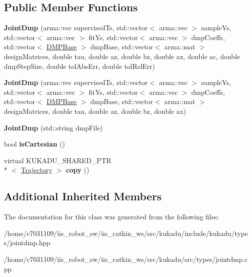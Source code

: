 \subsection*{Public Member Functions}
\begin{DoxyCompactItemize}
\item 
\hypertarget{classkukadu_1_1JointDmp_a2f2b43e39e2d7ece9ad0a958ccbac8e8}{{\bfseries Joint\-Dmp} (arma\-::vec supervised\-Ts, std\-::vector$<$ arma\-::vec $>$ sample\-Ys, std\-::vector$<$ arma\-::vec $>$ fit\-Ys, std\-::vector$<$ arma\-::vec $>$ dmp\-Coeffs, std\-::vector$<$ \hyperlink{classkukadu_1_1DMPBase}{D\-M\-P\-Base} $>$ dmp\-Base, std\-::vector$<$ arma\-::mat $>$ design\-Matrices, double tau, double az, double bz, double ax, double ac, double dmp\-Step\-Size, double tol\-Abs\-Err, double tol\-Rel\-Err)}\label{classkukadu_1_1JointDmp_a2f2b43e39e2d7ece9ad0a958ccbac8e8}

\item 
\hypertarget{classkukadu_1_1JointDmp_a58dc179759c2a9ebbbfe6d13cf65794c}{{\bfseries Joint\-Dmp} (arma\-::vec supervised\-Ts, std\-::vector$<$ arma\-::vec $>$ sample\-Ys, std\-::vector$<$ arma\-::vec $>$ fit\-Ys, std\-::vector$<$ arma\-::vec $>$ dmp\-Coeffs, std\-::vector$<$ \hyperlink{classkukadu_1_1DMPBase}{D\-M\-P\-Base} $>$ dmp\-Base, std\-::vector$<$ arma\-::mat $>$ design\-Matrices, double tau, double az, double bz, double ax)}\label{classkukadu_1_1JointDmp_a58dc179759c2a9ebbbfe6d13cf65794c}

\item 
\hypertarget{classkukadu_1_1JointDmp_a4984be2815b7a0b1e6f14ecee33593b2}{{\bfseries Joint\-Dmp} (std\-::string dmp\-File)}\label{classkukadu_1_1JointDmp_a4984be2815b7a0b1e6f14ecee33593b2}

\item 
\hypertarget{classkukadu_1_1JointDmp_a12d8909497b9d4f38c1cac86a1ad6601}{bool {\bfseries is\-Cartesian} ()}\label{classkukadu_1_1JointDmp_a12d8909497b9d4f38c1cac86a1ad6601}

\item 
\hypertarget{classkukadu_1_1JointDmp_ac3fd610d7a8e2f74143071d06ae04290}{virtual K\-U\-K\-A\-D\-U\-\_\-\-S\-H\-A\-R\-E\-D\-\_\-\-P\-T\-R\\*
$<$ \hyperlink{classkukadu_1_1Trajectory}{Trajectory} $>$ {\bfseries copy} ()}\label{classkukadu_1_1JointDmp_ac3fd610d7a8e2f74143071d06ae04290}

\end{DoxyCompactItemize}
\subsection*{Additional Inherited Members}


The documentation for this class was generated from the following files\-:\begin{DoxyCompactItemize}
\item 
/home/c7031109/iis\-\_\-robot\-\_\-sw/iis\-\_\-catkin\-\_\-ws/src/kukadu/include/kukadu/types/jointdmp.\-hpp\item 
/home/c7031109/iis\-\_\-robot\-\_\-sw/iis\-\_\-catkin\-\_\-ws/src/kukadu/src/types/jointdmp.\-cpp\end{DoxyCompactItemize}
